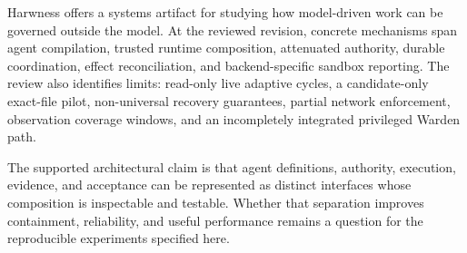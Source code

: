 Harwness offers a systems artifact for studying how model-driven work can be governed outside the model. At the reviewed revision, concrete mechanisms span agent compilation, trusted runtime composition, attenuated authority, durable coordination, effect reconciliation, and backend-specific sandbox reporting. The review also identifies limits: read-only live adaptive cycles, a candidate-only exact-file pilot, non-universal recovery guarantees, partial network enforcement, observation coverage windows, and an incompletely integrated privileged Warden path.

The supported architectural claim is that agent definitions, authority, execution, evidence, and acceptance can be represented as distinct interfaces whose composition is inspectable and testable. Whether that separation improves containment, reliability, and useful performance remains a question for the reproducible experiments specified here.

